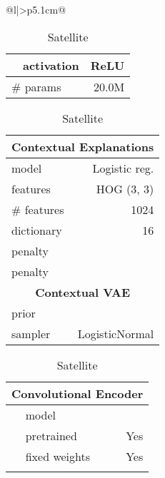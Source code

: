 \documentclass[twoside,11pt]{article}
\begin{document}
\begin{table}[t!]
\begin{tabular}[t]{@{}l|>{\raggedleft\arraybackslash}p{5.1cm}@{}}
\begin{table}[t!]
\begin{subtable}[t]{.52\textwidth}
\begin{tabular}[t]{@{}c|l|r@{}}
        &   activation                      & ReLU                      \\
        \midrule
        \multicolumn{2}{l}{\# params}       & 20.0M                     \\
        \bottomrule
    \end{tabular}\hspace{1pt}\setlength\tabcolsep{2pt}
    \begin{tabular}[t]{@{}l|r@{}}
        \toprule
        \multicolumn{2}{c}{\textbf{Contextual Explanations}}            \\
        \midrule
        model                         & Logistic reg.                   \\
        features                      & HOG (3, 3)                      \\
        \# features                   & 1024                            \\
        dictionary                    & 16                              \\
         penalty                 &                \\
         penalty                 &                \\
        \midrule[.75pt]
        \multicolumn{2}{c}{\textbf{Contextual VAE}}                     \\
        \midrule
        prior                               &        \\
        sampler                             & LogisticNormal            \\
        \bottomrule
    \end{tabular}
\end{subtable}\begin{subtable}[t]{.52\textwidth}
    \caption{\small Satellite}
    \centering
    \scriptsize
    \def\arraystretch{1.2}
    \setlength\tabcolsep{2pt}
    \begin{tabular}[t]{@{}c|l|r@{}}
        \toprule
        \multicolumn{3}{c}{\textbf{Convolutional Encoder}}              \\
        \midrule
        \multirow{3}{*}{\rotatebox{90}{VGG-F}}
        &   model                           & \VGGF                     \\
        &   pretrained                      & Yes                       \\
        &   fixed weights                   & Yes                       \\
        \midrule
        \multirow{6}{*}{\rotatebox{90}{MLP}}

\end{tabular}
\end{subtable}
\end{table}
\end{tabular}
\end{table}
\end{document}
